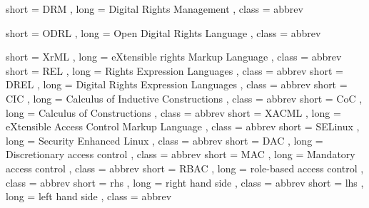 {
  short = DRM ,
  long  = Digital Rights Management ,
  class = abbrev
}

{
  short = ODRL ,
  long  = Open Digital Rights Language ,
  class = abbrev
}

{
  short = XrML ,
  long  = eXtensible rights Markup Language ,
  class = abbrev
}
{
  short = REL ,
  long  = Rights Expression Languages ,
  class = abbrev
}
{
  short = DREL ,
  long  = Digital Rights Expression Languages ,
  class = abbrev
}
{
  short = CIC ,
  long  = Calculus of Inductive Constructions ,
  class = abbrev
}
{
  short = CoC ,
  long  = Calculus of Constructions ,
  class = abbrev
}
{
  short = XACML ,
  long  = eXtensible Access Control Markup Language ,
  class = abbrev
}
{
  short = SELinux ,
  long  = Security Enhanced Linux ,
  class = abbrev
}
{
  short = DAC ,
  long  = Discretionary access control ,
  class = abbrev
}
{
  short = MAC ,
  long  = Mandatory access control ,
  class = abbrev
}
{
  short = RBAC ,
  long  = role-based access control ,
  class = abbrev
}
{
  short = rhs ,
  long  = right hand side ,
  class = abbrev
}
{
  short = lhs ,
  long  = left hand side ,
  class = abbrev
}


